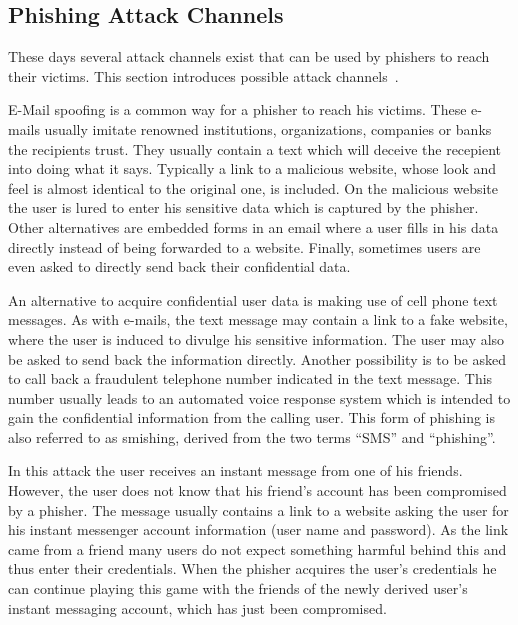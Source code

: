 \subsection{Phishing Attack Channels}
These days several attack channels exist that can be used by phishers to reach their victims. This section introduces possible attack channels~\cite{phishing2010ramazan}.
\label{s:attack_channels}
\begin{description}[leftmargin=0cm]
	\item[E-Mail] E-Mail spoofing is a common way for a phisher to reach his victims. These e-mails usually imitate renowned institutions, organizations, companies or banks the recipients trust. They usually contain a text which will deceive the recepient into doing what it says. Typically a link to a malicious website, whose look and feel is almost identical to the original one, is included. On the malicious website the user is lured to enter his sensitive data which is captured by the phisher. Other alternatives are embedded forms in an email where a user fills in his data directly instead of being forwarded to a website. Finally, sometimes users are even asked to directly send back their confidential data.
	\item[SMS] An alternative to acquire confidential user data is making use of cell phone text messages. As with e-mails, the text message may contain a link to a fake website, where the user is induced to divulge his sensitive information. The user may also be asked to send back the information directly. Another possibility is to be asked to call back a fraudulent telephone number indicated in the text message. This number usually leads to an automated voice response system which is intended to gain the confidential information from the calling user. This form of phishing is also referred to as smishing, derived from the two terms ``SMS'' and ``phishing''.
	\item[Instant Messaging] In this attack the user receives an instant message from one of his friends. However, the user does not know that his friend's account has been compromised by a phisher. The message usually contains a link to a website asking the user for his instant messenger account information (user name and password). As the link came from a friend many users do not expect something harmful behind this and thus enter their credentials. When the phisher acquires the user's credentials he can continue playing this game with the friends of the newly derived user's instant messaging account, which has just been compromised.

\end{description}
